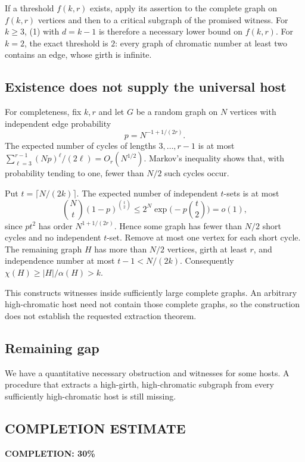 If a threshold $f(k,r)$ exists, apply its assertion to the complete graph on $f(k,r)$ vertices and then to a critical subgraph of the promised witness. For $k\ge3$, (1) with $d=k-1$ is therefore a necessary lower bound on $f(k,r)$. For $k=2$, the exact threshold is $2$: every graph of chromatic number at least two contains an edge, whose girth is infinite.

\subsection*{Existence does not supply the universal host}
For completeness, fix $k,r$ and let $G$ be a random graph on $N$ vertices with independent edge probability
\[
 p=N^{-1+1/(2r)}.
\]
The expected number of cycles of lengths $3,\ldots,r-1$ is at most
$\sum_{\ell=3}^{r-1}(Np)^\ell/(2\ell)=O_r(N^{1/2})$.
Markov's inequality shows that, with probability tending to one, fewer than $N/2$ such cycles occur.

Put $t=\lceil N/(2k)\rceil$. The expected number of independent $t$-sets is at most
\[
 {N\choose t}(1-p)^{\binom t2}
 \le 2^N\exp\bigl(-p\binom t2\bigr)=o(1),
\]
since $p t^2$ has order $N^{1+1/(2r)}$. Hence some graph has fewer than $N/2$ short cycles and no independent $t$-set. Remove at most one vertex for each short cycle. The remaining graph $H$ has more than $N/2$ vertices, girth at least $r$, and independence number at most $t-1<N/(2k)$. Consequently $\chi(H)\ge |H|/\alpha(H)>k$.

This constructs witnesses inside sufficiently large complete graphs. An arbitrary high-chromatic host need not contain those complete graphs, so the construction does not establish the requested extraction theorem.
\subsection*{Remaining gap}
We have a quantitative necessary obstruction and witnesses for some hosts. A procedure that extracts a high-girth, high-chromatic subgraph from every sufficiently high-chromatic host is still missing.
\subsection*{COMPLETION ESTIMATE}
\textbf{COMPLETION: 30\%}
